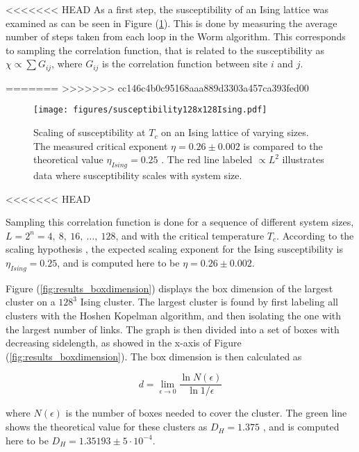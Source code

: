 <<<<<<< HEAD
As a first step, the susceptibility of an Ising lattice was examined as can be seen in Figure (\ref{fig:results_isingsusc}). This is done by measuring the average number of steps taken from each loop in the Worm algorithm. This corresponds to sampling the correlation function, that is related to the susceptibility as $\chi \propto \sum G_{ij}$, where $G_{ij}$ is the correlation function between site $i$ and $j$.

=======
>>>>>>> cc146c4b0c95168aaa889d3303a457ca393fed00

\begin{figure}[h!]
    \centering
        \texttt{[image: figures/susceptibility128x128Ising.pdf]}
    \caption{Scaling of susceptibility at $T_c$ on an Ising lattice of varying sizes. The measured critical exponent $\eta = 0.26 \pm 0.002$ is compared to the theoretical value $\eta_{Ising} = 0.25$ \cite{Plischke:EqStatMech}. The red line labeled $\propto L^2$ illustrates data where susceptibility scales with system size.}
    \label{fig:results_isingsusc}
\end{figure}

<<<<<<< HEAD

\noindent Sampling this correlation function is done for a sequence of different system sizes, $L = 2^n = 4, \ 8, \ 16, \ \ldots, \ 128$, and with the critical temperature $T_c$. According to the scaling hypothesis \cite{Plischke:EqStatMech}, the expected scaling exponent for the Ising susceptibility is $\eta_{Ising} = 0.25$, and is computed here to be $\eta = 0.26 \pm 0.002$.

Figure (\ref{fig:results_boxdimension}) displays the box dimension of the largest cluster on a $128^3$ Ising cluster. The largest cluster is found by first labeling all clusters with the Hoshen Kopelman algorithm, and then isolating the one with the largest number of links. The graph is then divided into a set of boxes with decreasing sidelength, as showed in the x-axis of Figure (\ref{fig:results_boxdimension}). The box dimension is then calculated as

\begin{equation}
    d = \lim_{\epsilon \to 0} \frac{\ln N(\epsilon)}{\ln 1 / \epsilon}
\end{equation}

where $N(\epsilon)$ is the number of boxes needed to cover the cluster. The green line shows the theoretical value for these clusters as $D_H = 1.375$ \cite{Duplantier:GeoHausdorff}, and is computed here to be $D_H = 1.35193 \pm 5 \cdot 10^{-4}$.

